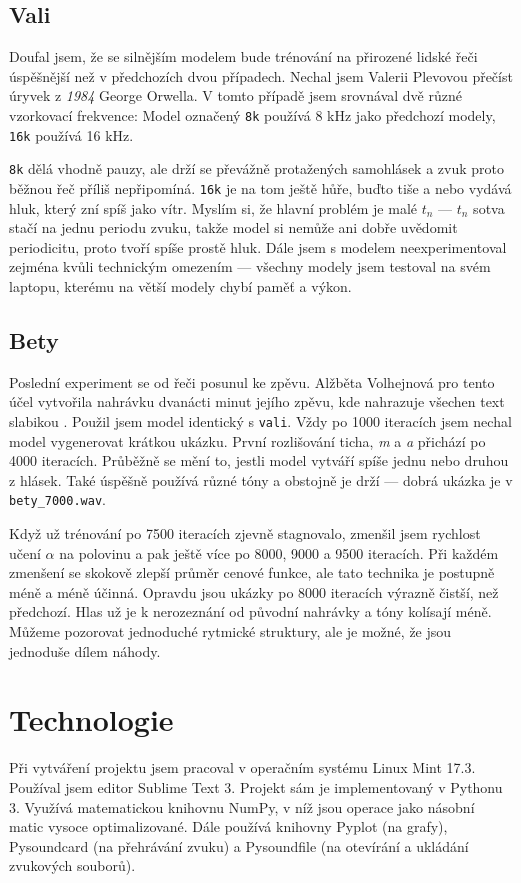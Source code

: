 \documentclass[a4]{article}
\begin{document}
\subsection{Vali}
Doufal jsem, že se silnějším modelem bude trénování na přirozené lidské řeči úspěšnější než v předchozích dvou případech. Nechal jsem Valerii Plevovou přečíst úryvek z \textit{1984} George Orwella. V tomto případě jsem srovnával dvě různé vzorkovací frekvence: Model označený \verb|8k| používá 8 kHz jako předchozí modely, \verb|16k| používá 16 kHz.

\verb|8k| dělá vhodně pauzy, ale drží se převážně protažených samohlásek a zvuk proto běžnou řeč příliš nepřipomíná. \verb|16k| je na tom ještě hůře, buďto tiše  a nebo vydává hluk, který zní spíš jako vítr. Myslím si, že hlavní problém je malé $t_n$ --- $t_n$ sotva stačí na jednu periodu zvuku, takže model si nemůže ani dobře uvědomit periodicitu, proto tvoří spíše prostě hluk. Dále jsem s modelem neexperimentoval zejména kvůli technickým omezením --- všechny modely jsem testoval na svém laptopu, kterému na větší modely chybí paměť a výkon.

\subsection{Bety}
Poslední experiment se od řeči posunul ke zpěvu. Alžběta Volhejnová pro tento účel vytvořila nahrávku dvanácti minut jejího zpěvu, kde nahrazuje všechen text slabikou . Použil jsem model identický s \verb|vali|.  Vždy po 1000 iteracích jsem nechal model vygenerovat krátkou ukázku. První rozlišování ticha, \textit{m} a \textit{a} přichází po 4000 iteracích. Průběžně se mění to, jestli model vytváří spíše jednu nebo druhou z hlásek. Také úspěšně používá různé tóny a obstojně je drží --- dobrá ukázka je v \verb|bety_7000.wav|.

Když už trénování po 7500 iteracích zjevně stagnovalo, zmenšil jsem rychlost učení $\alpha$ na polovinu a pak ještě více po 8000, 9000 a 9500 iteracích. Při každém zmenšení se skokově zlepší průměr cenové funkce, ale tato technika je postupně méně a méně účinná. Opravdu jsou ukázky po 8000 iteracích výrazně čistší, než předchozí. Hlas už je k nerozeznání od původní nahrávky a tóny kolísají méně. Můžeme pozorovat jednoduché rytmické struktury, ale je možné, že jsou jednoduše dílem náhody.

\section{Technologie}
Při vytváření projektu jsem pracoval v operačním systému Linux Mint 17.3. Používal jsem editor Sublime Text 3. Projekt sám je implementovaný v Pythonu 3. Využívá matematickou knihovnu NumPy, v níž jsou operace jako násobní matic vysoce optimalizované. Dále používá knihovny Pyplot (na grafy), Pysoundcard (na přehrávání zvuku) a Pysoundfile (na otevírání a ukládání zvukových souborů).
\end{document}
